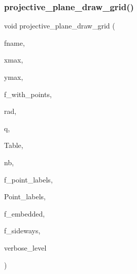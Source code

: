 \subsubsection{\texorpdfstring{projective\+\_\+plane\+\_\+draw\+\_\+grid()}{projective\_plane\_draw\_grid()}}
{\footnotesize\ttfamily void projective\+\_\+plane\+\_\+draw\+\_\+grid (\begin{DoxyParamCaption}\item[{const char $\ast$}]{fname,  }\item[{\mbox{\hyperlink{galois_8h_a09fddde158a3a20bd2dcadb609de11dc}{I\+NT}}}]{xmax,  }\item[{\mbox{\hyperlink{galois_8h_a09fddde158a3a20bd2dcadb609de11dc}{I\+NT}}}]{ymax,  }\item[{\mbox{\hyperlink{galois_8h_a09fddde158a3a20bd2dcadb609de11dc}{I\+NT}}}]{f\+\_\+with\+\_\+points,  }\item[{\mbox{\hyperlink{galois_8h_a09fddde158a3a20bd2dcadb609de11dc}{I\+NT}}}]{rad,  }\item[{\mbox{\hyperlink{galois_8h_a09fddde158a3a20bd2dcadb609de11dc}{I\+NT}}}]{q,  }\item[{\mbox{\hyperlink{galois_8h_a09fddde158a3a20bd2dcadb609de11dc}{I\+NT}} $\ast$}]{Table,  }\item[{\mbox{\hyperlink{galois_8h_a09fddde158a3a20bd2dcadb609de11dc}{I\+NT}}}]{nb,  }\item[{\mbox{\hyperlink{galois_8h_a09fddde158a3a20bd2dcadb609de11dc}{I\+NT}}}]{f\+\_\+point\+\_\+labels,  }\item[{\mbox{\hyperlink{galois_8h_ab6cc7b4aeb6ea31aba2b3fbfc83ff5e6}{B\+Y\+TE}} $\ast$$\ast$}]{Point\+\_\+labels,  }\item[{\mbox{\hyperlink{galois_8h_a09fddde158a3a20bd2dcadb609de11dc}{I\+NT}}}]{f\+\_\+embedded,  }\item[{\mbox{\hyperlink{galois_8h_a09fddde158a3a20bd2dcadb609de11dc}{I\+NT}}}]{f\+\_\+sideways,  }\item[{\mbox{\hyperlink{galois_8h_a09fddde158a3a20bd2dcadb609de11dc}{I\+NT}}}]{verbose\+\_\+level }\end{DoxyParamCaption})}

\mbox{\label{plot_8_c_ab39804332acaaaaa6c7f3fd56ac914b3}} 
